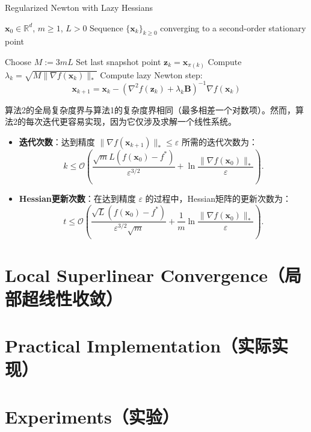 \documentclass[a4paper,twoside,AutoFakeBold]{article}
\theoremstyle{definition}
\begin{document}
\begin{algorithm}
\caption{Regularized Newton with Lazy Hessians}
\label{alg:reg_newton_lazy_hessians}
\begin{algorithmic}[2]
\REQUIRE $\mathbf{x}_{0} \in \mathbb{R}^{d}$, $m \geq 1$, $L > 0$
\ENSURE Sequence $\{\mathbf{x}_{k}\}_{k \geq 0}$ converging to a second-order stationary point

\STATE Choose $M := 3mL$ 
	\STATE Set last snapshot point $\mathbf{z}_{k} = \mathbf{x}_{\pi(k)}$ 
	\STATE Compute $\lambda_{k} = \sqrt{M \|\nabla f(\mathbf{x}_{k})\|_{*}}$ 
	\STATE Compute lazy Newton step:
	\[
	\mathbf{x}_{k+1} = \mathbf{x}_{k} - \left( \nabla^{2}f(\mathbf{z}_{k}) + \lambda_{k} \mathbf{B} \right)^{-1} \nabla f(\mathbf{x}_{k})
	\]
\ENDFOR
\end{algorithmic}
\end{algorithm}
算法2的全局复杂度界与算法1的复杂度界相同（最多相差一个对数项）。然而，算法2的每次迭代更容易实现，因为它仅涉及求解一个线性系统。
\begin{itemize}
    \item \textbf{迭代次数}：达到精度 \(\|\nabla f(\mathbf{x}_{k+1})\|_{*} \leq \varepsilon\) 所需的迭代次数为：
    \[
    k \leq \mathcal{O}\left( \frac{\sqrt{m} L (f(\mathbf{x}_{0}) - f^{*})}{\varepsilon^{3/2}} + \ln \frac{\|\nabla f(\mathbf{x}_{0})\|_{*}}{\varepsilon} \right).
    \]
    \item \textbf{Hessian更新次数}：在达到精度 \(\varepsilon\) 的过程中，Hessian矩阵的更新次数为：
    \[
    t \leq \mathcal{O}\left( \frac{\sqrt{L} (f(\mathbf{x}_{0}) - f^{*})}{\varepsilon^{3/2} \sqrt{m}} + \frac{1}{m} \ln \frac{\|\nabla f(\mathbf{x}_{0})\|_{*}}{\varepsilon} \right).
    \]
\end{itemize}
\section{Local Superlinear Convergence（局部超线性收敛）}


\section{Practical Implementation（实际实现）}

\newpage
\section{Experiments（实验）}
\end{document}
